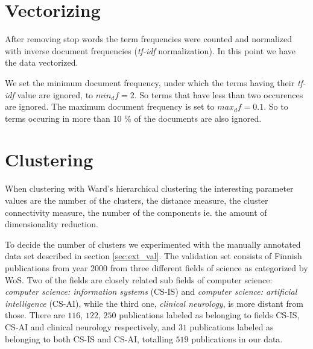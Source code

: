 \section{Vectorizing}
After removing stop words the term frequencies were counted and 
normalized with inverse document frequencies (\emph{tf-idf} 
normalization). 
In this point we have the data vectorized.

We set the minimum document frequency, under which the terms 
having their \emph{tf-idf} value are ignored, to $min_df=2$. So 
terms that have less than two occurences are ignored. The maximum 
document frequency is set to $max_df=0.1$. So to terms 
occuring in more than 10 \% of the documents are also ignored.



\section{Clustering}
When clustering with Ward's hierarchical clustering the 
interesting parameter values are the number of the clusters, 
the distance measure, the cluster connectivity measure, the 
number of the components ie. the amount of dimensionality 
reduction. 

To decide the number of clusters we experimented with the manually 
annotated data set described in section \ref{sec:ext_val}.
The validation set consists of Finnish publications from year 2000
from three different fields of science as categorized by WoS.
Two of the fields are closely related sub fields of computer
science: \emph{computer science: information systems} (CS-IS) and 
\emph{computer science: 
artificial intelligence} (CS-AI), while the third one, 
\emph{clinical neurology}, is more distant from those. There are 
$116$, $122$, $250$ publications labeled as belonging to fields 
CS-IS, CS-AI and clinical neurology respectively, and $31$ 
publications labeled as belonging to both CS-IS and CS-AI, 
totalling $519$ publications in our data.

